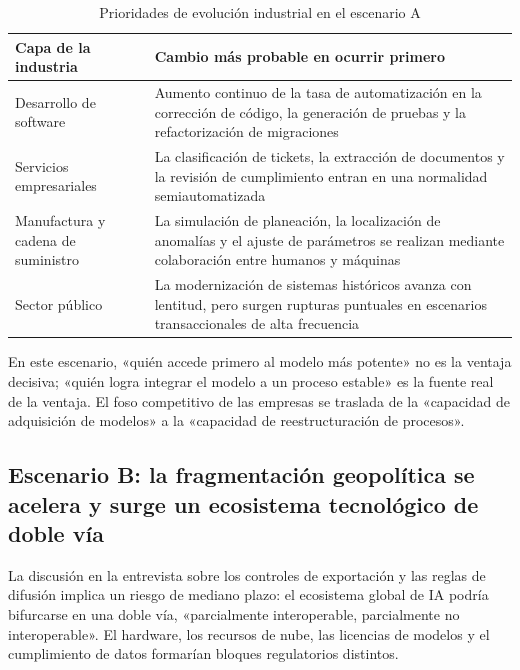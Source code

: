 \documentclass[a4paper]{article}
\begin{document}
\begin{table}[H]
\centering
\begin{tabular}{lp{8.8cm}}
\toprule
\textbf{Capa de la industria} & \textbf{Cambio más probable en ocurrir primero} \\
\midrule
Desarrollo de software & Aumento continuo de la tasa de automatización en la corrección de código, la generación de pruebas y la refactorización de migraciones \\
Servicios empresariales & La clasificación de tickets, la extracción de documentos y la revisión de cumplimiento entran en una normalidad semiautomatizada \\
Manufactura y cadena de suministro & La simulación de planeación, la localización de anomalías y el ajuste de parámetros se realizan mediante colaboración entre humanos y máquinas \\
Sector público & La modernización de sistemas históricos avanza con lentitud, pero surgen rupturas puntuales en escenarios transaccionales de alta frecuencia \\
\bottomrule
\end{tabular}
\caption{Prioridades de evolución industrial en el escenario A}
\end{table}

En este escenario, «quién accede primero al modelo más potente» no es la ventaja decisiva; «quién logra integrar el modelo a un proceso estable» es la fuente real de la ventaja. El foso competitivo de las empresas se traslada de la «capacidad de adquisición de modelos» a la «capacidad de reestructuración de procesos».

\subsection{Escenario B: la fragmentación geopolítica se acelera y surge un ecosistema tecnológico de doble vía}

La discusión en la entrevista sobre los controles de exportación y las reglas de difusión implica un riesgo de mediano plazo: el ecosistema global de IA podría bifurcarse en una doble vía, «parcialmente interoperable, parcialmente no interoperable». El hardware, los recursos de nube, las licencias de modelos y el cumplimiento de datos formarían bloques regulatorios distintos.
\end{document}
